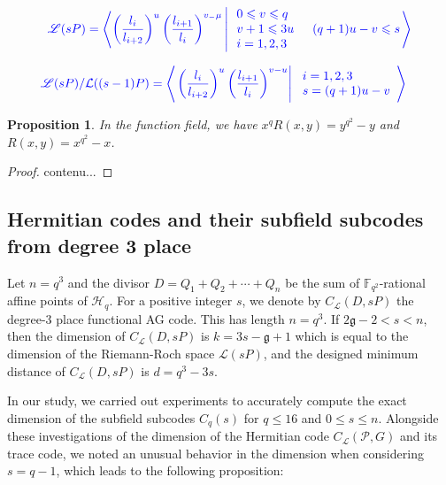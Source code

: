 \documentclass[a4paper]{amsart}
\theoremstyle{plain}
\newtheorem{proposition}[theorem]{Proposition}
\theoremstyle{definition}
\theoremstyle{remark}
\newcommand{\calL}{\mathcal{L}}
\begin{document}
	\[\textcolor{blue}{\begin{aligned}
		& \mathscr{L}(s P)=\left\langle\left(\frac{l_i}{l_{i+2}}\right)^u\left(\frac{l_{i+1}}{l_i}\right)^{v_{-} \mu} \left\lvert\, \begin{array}{l}
			0 \leqslant v \leqslant q \\
			v+1 \leqslant 3 u \\
			i=1,2,3
		\end{array} \quad(q+1) u-v \leqslant s\right.\right\rangle \\
	\end{aligned}}\]
	
	\[\textcolor{blue}{\begin{aligned}
		& \mathscr{L}(s P) / \mathcal{L}((s-1) P)=\left\langle\left.\left(\frac{l_i}{l_{i+2}}\right)^u\left(\frac{l_{i+1}}{l_i}\right)^{v-u} \right\rvert\, \begin{array}{l}
			i=1,2,3 \\
			s=(q+1) u-v
		\end{array}\right\rangle
	\end{aligned}}\]


\begin{proposition}
	In the function field, we have $x^q R(x, y)=y^{q^2}-y$ and $R(x, y)=x^{q^2}-x$.
\end{proposition}

\begin{proof}
	contenu...
\end{proof}
\subsection{Hermitian codes and their subfield subcodes from degree 3 place}
Let $n=q^3$ and the divisor $D=Q_1+Q_2+\cdots+Q_n$ be the sum of $\mathbb{F}_{q^2}$-rational affine points of $\mathscr{H}_q$. For a positive integer $s$, we denote by $C_{\calL}(D,sP)$ the degree-3 place functional AG code. This has length $n=q^3$. If $2 \mathfrak{g}-2<s<n$, then the dimension of $C_{\calL}(D,sP)$ is $k=3s-\mathfrak{g}+1$ which is equal to the dimension of the Riemann-Roch space $\mathscr{L}\left(s P\right)$, and  the designed minimum distance of $C_{\calL}(D,sP)$ is $d=q^3-3s$.



In our study, we carried out experiments to accurately compute the exact dimension of the subfield subcodes $ C_{q}(s) $ for $ q \leq 16 $ and $0 \leq s \leq n$. Alongside these investigations of the dimension of the Hermitian code $ C_{\mathcal{L}}(\mathcal{P}, G) $ and its trace code, we noted an unusual behavior in the dimension when considering $s = q - 1 $, which leads to the following proposition:
\end{document}
